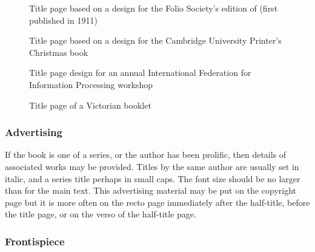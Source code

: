 \documentclass[10pt,a4paper,oneside,extrafontsizes]{memoir}%
\begin{document}
\begin{figure}
\centering
\begin{showtitle}
\titleZD
\end{showtitle}
\caption{Title page based on a design for the Folio Society's edition of
   (first published in 1911)} \label{fig:titleZD}
\end{figure}


\begin{figure}
\centering
\begin{showtitle}
\titleWH
\end{showtitle}
\caption{Title page based on a design for the Cambridge University 
Printer's Christmas book } \label{fig:titleWH}
\end{figure}


\begin{figure}
\centering
\begin{showtitle}
\titleGP
\end{showtitle}
\caption{Title page design for an annual International Federation for 
    Information Processing workshop} \label{fig:titleGP}
\end{figure}


\begin{figure}
\centering
{\titleRB}
\caption{Title page of a Victorian booklet} \label{fig:titleRB}
\end{figure}



\subsubsection{Advertising}

\begin{paracol}{2}
\switchEng
    If the book is one of a series, or the author has been prolific, then
details of associated works may be provided. Titles by the same author
are usually set in italic, and a series title perhaps in small caps. The
font size should be no larger than for the main text. This advertising material
may be put on the copyright page but it is more often on the recto page
immediately after the half-title, before the title page, or on the verso of 
the half-title page.
\end{paracol}

\subsubsection{Frontispiece}
\end{document}
